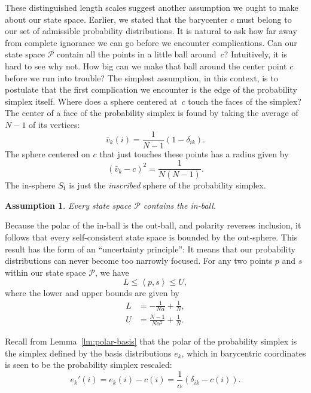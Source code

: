 \documentclass[aps,pra,superscriptaddress,10pt,tightenlines,twocolumn,nofootinbib]{revtex4}
\newtheorem{assump}{Assumption}
\theoremstyle{remark}
\newcommand{\be}{\begin{equation}}
\newcommand{\ee}{\end{equation}}
\newcommand{\si}{S_{\rm{i}}}
\newcommand{\cP}{\mathcal{P}}
\newcommand{\inprod}[2]{{\left\langle #1 , #2 \right\rangle}}
\begin{document}
These distinguished length scales suggest another assumption we ought to make about our state space.  Earlier, we stated that the barycenter $c$ must belong to our set of admissible probability distributions.  It is natural to ask how far away from complete ignorance we can go before we encounter complications.  Can our state space $\cP$ contain all the points in a little ball around~$c$?  Intuitively, it is hard to see why not.  How big can we make that ball around the center point $c$ before we run into trouble?  The simplest assumption, in this context, is to postulate that the first complication we encounter is the edge of the probability simplex itself.  Where does a sphere centered at~$c$ touch the faces of the simplex?  The center of a face of the probability simplex is found by
taking the average of $N-1$ of its vertices:
\begin{equation}
\bar{v}_k(i) = \frac{1}{N-1}(1 - \delta_{ik}).
\end{equation}
The sphere centered on $c$ that just touches these points has a radius
given by
\begin{equation}
(\bar{v}_k - c)^2 = \frac{1}{N(N-1)}.
\end{equation}
The in-sphere $\si$ is just the \emph{inscribed} sphere of the probability simplex.

\begin{assump}
\label{assump:upper-bound}
Every state space $\cP$ contains the in-ball.
\end{assump}

Because the polar of the in-ball is the out-ball, and polarity
reverses inclusion, it follows that every self-consistent state space
is bounded by the out-sphere.  This result has the form of an
``uncertainty principle'': It means that our probability distributions
can never become too narrowly focused.  For any two points $p$ and $s$ within our state space $\cP$, we have
\be
L \leq \inprod{p}{s} \leq U,
\ee
where the lower and upper bounds are given by
\begin{align}
L &= -\frac{1}{N\alpha} + \frac{1}{N}, \\
U &= \frac{N-1}{N\alpha^2} + \frac{1}{N}.
\end{align}

Recall from
Lemma~\ref{lm:polar-basis} that the polar of the probability simplex is the simplex defined by the basis distributions $e_k$,
which in barycentric coordinates is seen to be the probability simplex
rescaled:
\be
e_k'(i) = e_k(i) - c(i) = \frac{1}{\alpha}\left(\delta_{ik} - c(i)\right).
\ee
\end{document}
